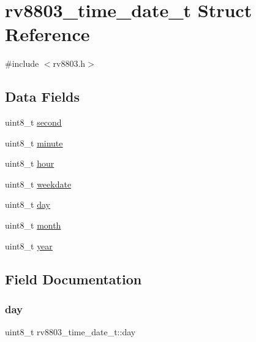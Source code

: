 \hypertarget{structrv8803__time__date__t}{}\section{rv8803\+\_\+time\+\_\+date\+\_\+t Struct Reference}
\label{structrv8803__time__date__t}


{\ttfamily \#include $<$rv8803.\+h$>$}

\subsection*{Data Fields}
\begin{DoxyCompactItemize}
\item 
uint8\+\_\+t \hyperlink{structrv8803__time__date__t_a126916c9c6116f77427ad55ec2fdb606}{second}
\item 
uint8\+\_\+t \hyperlink{structrv8803__time__date__t_a8706361cebbbbff437c583e26ea45806}{minute}
\item 
uint8\+\_\+t \hyperlink{structrv8803__time__date__t_a8f423232abec53693e06dc224e2e6357}{hour}
\item 
uint8\+\_\+t \hyperlink{structrv8803__time__date__t_afa4ba5a26e487c59ff22700747146e42}{weekdate}
\item 
uint8\+\_\+t \hyperlink{structrv8803__time__date__t_a995ef6fef09a78aab79317fa5b65cdca}{day}
\item 
uint8\+\_\+t \hyperlink{structrv8803__time__date__t_a9ad72e9c58f92daf14c06b0e4add5094}{month}
\item 
uint8\+\_\+t \hyperlink{structrv8803__time__date__t_ac2c99514f36e27e7debf81dd96435cac}{year}
\end{DoxyCompactItemize}


\subsection{Field Documentation}
\mbox{\label{structrv8803__time__date__t_a995ef6fef09a78aab79317fa5b65cdca}} 
\subsubsection{\texorpdfstring{day}{day}}
{\footnotesize\ttfamily uint8\+\_\+t rv8803\+\_\+time\+\_\+date\+\_\+t\+::day}


